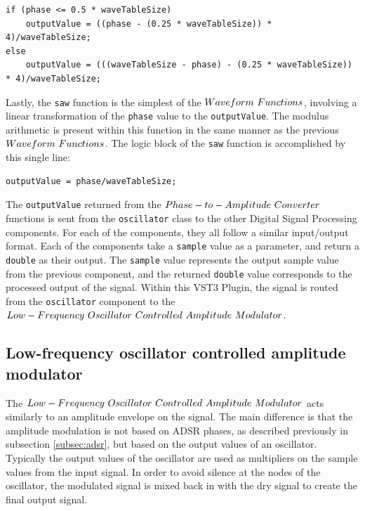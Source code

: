 \documentclass[a4paper,12pt]{report}
\begin{document}
 \noindent\begin{minipage}{\linewidth} \begin{lstlisting}[caption={The \texttt{triangle()} waveform function},label={code:triangle},captionpos=b]
if (phase <= 0.5 * waveTableSize)
    outputValue = ((phase - (0.25 * waveTableSize)) * 4)/waveTableSize;
else
    outputValue = (((waveTableSize - phase) - (0.25 * waveTableSize)) * 4)/waveTableSize;
\end{lstlisting} \end{minipage}

Lastly, the \texttt{saw} function is the simplest of the $Waveform\ \-Functions$, involving a linear transformation of the \texttt{phase} value to the \texttt{output\-Value}. The modulus arithmetic is present within this function in the same manner as the previous $Waveform\ \-Functions$. The logic block of the \texttt{saw} function is accomplished by this single line:

 \noindent\begin{minipage}{\linewidth} \begin{lstlisting}[caption={The \texttt{saw()} waveform function},label={code:saw},captionpos=b]
outputValue = phase/waveTableSize;
\end{lstlisting} \end{minipage}

The \texttt{output\-Value} returned from the $Phase-to-Amplitude\ \-Converter$ functions is sent from the \texttt{oscillator} class to the other Digital Signal Processing components. For each of the components, they all follow a similar input/output format. Each of the components take a \texttt{sample} value as a parameter, and return a \texttt{double} as their output. The \texttt{sample} value represents the output sample value from the previous component, and the returned \texttt{double} value corresponds to the processed output of the signal. Within this VST3 Plugin, the signal is routed from the \texttt{oscillator} component to the $Low-Frequency\ \-Oscillator\ \-Controlled\ \-Amplitude\ \-Modulator$.

\subsection{Low-frequency oscillator controlled amplitude modulator}
\label{subsec:lfcocontrolampmod}
The $Low-Frequency\ \-Oscillator\ \-Controlled\ \-Amplitude\ \-Modulator$ acts similarly to an amplitude envelope on the signal. The main difference is that the amplitude modulation is not based on ADSR phases, as described previously in subsection \ref{subsec:adsr}, but based on the output values of an oscillator. Typically the output values of the oscillator are used as multipliers on the sample values from the input signal. In order to avoid silence at the nodes of the oscillator, the modulated signal is mixed back in with the dry signal to create the final output signal.
\end{document}
